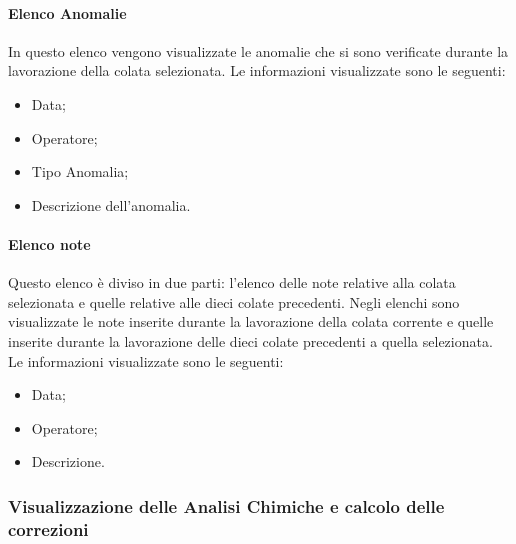   \paragraph{Elenco Anomalie}
  In questo elenco vengono visualizzate le anomalie che si sono verificate durante la lavorazione della colata 
  selezionata. Le informazioni visualizzate sono le seguenti:
  \begin{itemize}
    \item Data;
    \item Operatore;
    \item Tipo Anomalia;
    \item Descrizione dell'anomalia.
  \end{itemize} 
  
  \paragraph{Elenco note}
  Questo elenco è diviso in due parti: l'elenco delle note relative alla colata selezionata e quelle relative alle 
  dieci colate precedenti. Negli elenchi sono visualizzate le note inserite durante la lavorazione della colata corrente 
  e quelle inserite durante la lavorazione delle dieci colate precedenti a quella selezionata. 
  Le informazioni visualizzate sono le seguenti:
  \begin{itemize}
    \item Data;
    \item Operatore;
    \item Descrizione.
  \end{itemize}   

  \subsubsection{Visualizzazione delle Analisi Chimiche e calcolo delle correzioni}
